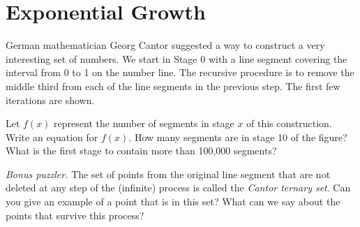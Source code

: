 \section{Exponential Growth}
\label{sec:expogrowth}

\begin{boxedexplore}
\end{boxedexplore}

\begin{boxedexplore}
German mathematician Georg Cantor suggested a way to construct a very interesting set of numbers. We start in Stage 0 with a line segment covering the interval from 0 to 1 on the number line. The recursive procedure is to remove the middle third from each of the line segments in the previous step. The first few iterations are shown.

\newlength{\cantorht}
\setlength{\cantorht}{0.25cm}
\begin{center}
\end{center}

Let $f(x)$ represent the number of segments in stage $x$ of this construction. Write an equation for $f(x)$. How many segments are in stage 10 of the figure? What is the first stage to contain more than 100,000 segments?

\textit{Bonus puzzler.} The set of points from the original line segment that are not deleted at any step of the (infinite) process is called the \textit{Cantor ternary set}. Can you give an example of a point that is in this set? What can we say about the points that survive this process?
\end{boxedexplore}

